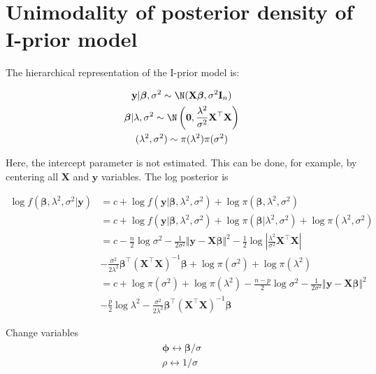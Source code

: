 \newpage
\section{Unimodality of posterior density of I-prior model}

The hierarchical representation of the I-prior model is:

\begin{align*}
	\begin{gathered}
		\mathbf y | \boldsymbol\beta, \sigma^2 \sim \N(\mathbf X \boldsymbol\beta, \sigma^2 \mathbf I_n) \\
		\boldsymbol\beta | \lambda, \sigma^2 \sim \N \left( \mathbf 0, \frac{\lambda^2}{\sigma^2} \mathbf X^\top \mathbf X \right) \\
		(\lambda^2, \sigma^2) \sim \pi(\lambda^2) \pi(\sigma^2)
	\end{gathered}
\end{align*}

Here, the intercept parameter is not estimated. This can be done, for example, by centering all $\mathbf X$ and $\mathbf y$ variables. The log posterior is

\begin{align*}
	\log f(\boldsymbol{\beta}, \lambda^2, \sigma^2 | \mathbf y) 
	&= c + \log f(\mathbf y | \boldsymbol{\beta}, \lambda^2, \sigma^2) + \log \pi(\boldsymbol{\beta}, \lambda^2, \sigma^2) \\
	&= c + \log f(\mathbf y | \boldsymbol{\beta}, \lambda^2, \sigma^2) + \log \pi(\boldsymbol{\beta} | \lambda^2, \sigma^2) + \log \pi(\lambda^2, \sigma^2) \\
	&= c - \frac{n}{2} \log \sigma^2 - \frac{1}{2\sigma^2} \Vert \mathbf y - \mathbf X \boldsymbol{\beta} \Vert^2 - \frac{1}{2} \log \left\vert \frac{\lambda^2}{\sigma^2} \mathbf X^\top \mathbf X \right\vert \\
	& -\frac{\sigma^2}{2\lambda^2} \boldsymbol{\beta}^\top (\mathbf X^\top \mathbf X)^{-1} \boldsymbol{\beta} + \log \pi(\sigma^2) + \log \pi(\lambda^2) \\
	&= c + \log \pi(\sigma^2) + \log \pi(\lambda^2) - \frac{n-p}{2} \log \sigma^2 - \frac{1}{2\sigma^2} \Vert \mathbf y - \mathbf X \boldsymbol{\beta} \Vert^2 \\
	&  - \frac{p}{2} \log \lambda^2 -\frac{\sigma^2}{2\lambda^2} \boldsymbol{\beta}^\top (\mathbf X^\top \mathbf X)^{-1} \boldsymbol{\beta} 
\end{align*}

Change variables
\begin{align*}
	\begin{gathered}
		\boldsymbol\phi \leftrightarrow \boldsymbol{\beta}/\sigma \\
		\rho \leftrightarrow 1/\sigma
	\end{gathered}
\end{align*}


